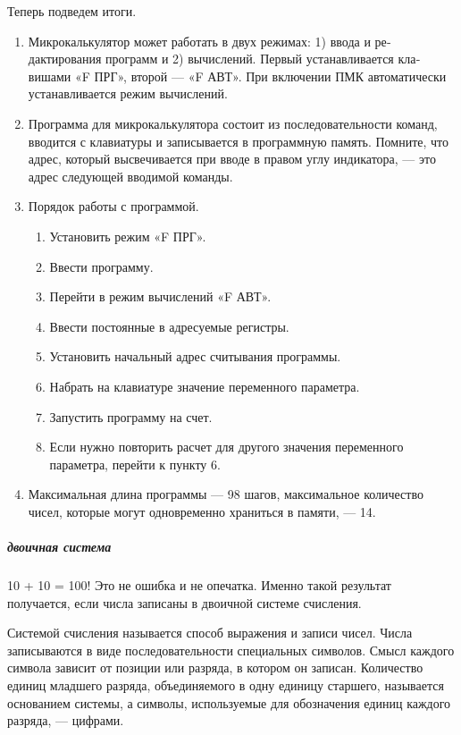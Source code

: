\documentclass[11pt,a4paper,oneside]{article}
\providecommand{\tightlist}{%
    \setlength{\itemsep}{0pt}\setlength{\parskip}{0pt}}
\begin{document}
Теперь подведем итоги.
\begin{enumerate}
\tightlist
\item Микрокалькулятор может рабо­тать в двух режимах: 1) ввода и ре­дактирования программ и 2) вычис­лений. Первый устанавливается кла­вишами «F ПРГ», второй — «F АВТ». При включении ПМК автоматически устанавливается режим вычислений.
\item Программа для микрокалькуля­тора состоит из последовательности команд, вводится с клавиатуры и записывается в программную память. Помните, что адрес, который высве­чивается при вводе в правом углу индикатора, — это адрес следующей вводимой команды.
\item Порядок работы с программой.
\begin{enumerate}[label=\arabic*)]
\item Установить режим «F ПРГ».
\item Ввести программу.
\item Перейти в режим вычисле­ний «F АВТ».
\item Ввести постоянные в адресу­емые регистры.
\item Установить начальный адрес считывания программы.
\item Набрать на клавиатуре значе­ние переменного параметра.
\item Запустить программу на счет.
\item Если нужно повторить рас­чет для другого значения пе­ременного параметра, перей­ти к пункту 6.
\end{enumerate}
\item Максимальная длина програм­мы — 98 шагов, максимальное коли­чество чисел, которые могут одно­временно храниться в памяти, — 14.
\end{enumerate}

\subparagraph{двоичная система}
10 + 10 = 100!
Это не ошибка и не опечатка. Именно такой результат получается, если числа записаны в двоичной системе счисле­ния.

Системой счисления называется способ выражения и записи чисел. Числа записываются в виде последовательности специ­альных символов. Смысл каждого символа зависит от пози­ции или разряда, в котором он записан. Количество единиц младшего разряда, объединяемого в одну единицу старшего, называется основанием системы, а символы, используемые для обозначения единиц каждого разряда, — цифрами.
\end{document}
